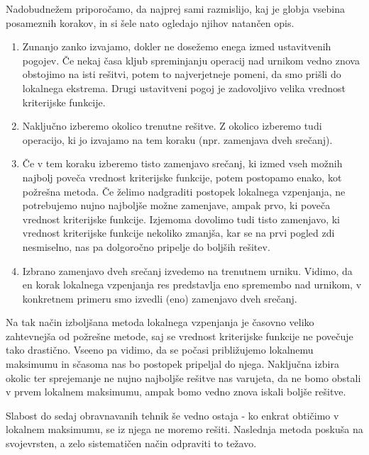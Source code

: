 \documentclass[a4paper, 10pt]{article}
\begin{document}
Nadobudnežem priporočamo, da najprej sami razmislijo, kaj je globja vsebina posameznih
korakov, in si šele nato ogledajo njihov natančen opis.

\begin{enumerate}
   
      \item Zunanjo zanko izvajamo, dokler ne dosežemo enega izmed ustavitvenih pogojev.
      Če nekaj časa kljub spreminjanju operacij nad urnikom vedno znova obstojimo na isti
      rešitvi, potem to najverjetneje pomeni, da smo prišli do lokalnega ekstrema. Drugi
      ustavitveni pogoj je zadovoljivo velika vrednost kriterijske funkcije.
   
      \item Naključno izberemo okolico trenutne rešitve. Z okolico izberemo tudi operacijo,
      ki jo izvajamo na tem koraku (npr. zamenjava dveh srečanj).
   
      \item Če v tem koraku izberemo tisto zamenjavo srečanj, ki izmed vseh možnih najbolj
      poveča vrednost kriterijske funkcije, potem postopamo enako, kot požrešna metoda. Če
      želimo nadgraditi postopek lokalnega vzpenjanja, ne potrebujemo nujno najboljše možne
      zamenjave, ampak prvo, ki poveča vrednost kriterijske funkcije. Izjemoma dovolimo tudi
      tisto zamenjavo, ki vrednost kriterijske funkcije nekoliko zmanjša, kar se na prvi
      pogled zdi nesmiselno, nas pa dolgoročno pripelje do boljših rešitev.
   
      \item Izbrano zamenjavo dveh srečanj izvedemo na trenutnem urniku. Vidimo, da en korak
      lokalnega vzpenjanja res predstavlja eno spremembo nad urnikom, v konkretnem primeru
      smo izvedli (eno) zamenjavo dveh srečanj.
   
   
\end{enumerate}

Na tak način izboljšana metoda lokalnega vzpenjanja je časovno veliko zahtevnejša od
požrešne metode, saj se vrednost kriterijske funkcije ne povečuje tako drastično. Vseeno
pa vidimo, da se počasi približujemo lokalnemu maksimumu in sčasoma nas bo postopek
pripeljal do njega. Naključna izbira okolic ter sprejemanje ne nujno najboljše rešitve
nas varujeta, da ne bomo obstali v prvem lokalnem maksimumu, ampak bomo vedno znova
iskali boljše rešitve.

Slabost do sedaj obravnavanih tehnik še vedno ostaja - ko enkrat obtičimo v lokalnem
maksimumu, se iz njega ne moremo rešiti. Naslednja metoda poskuša na svojevrsten, a zelo
sistematičen način odpraviti to težavo.
\end{document}
